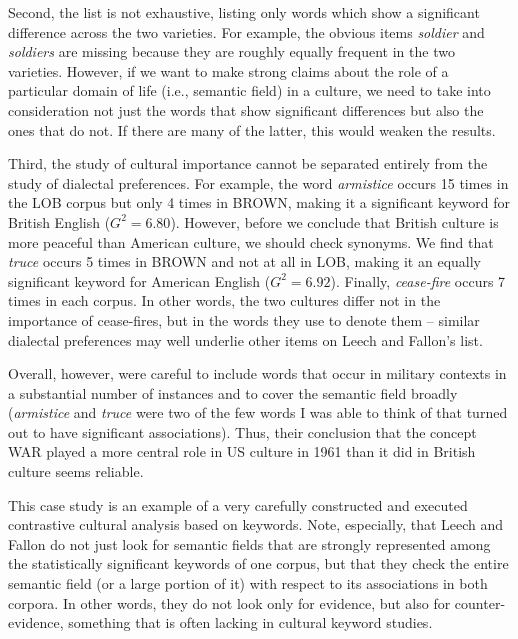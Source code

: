 Second, the list is not exhaustive, listing only words which show a significant difference across the two varieties.  For example, the obvious items \textit{soldier} and \textit{soldiers} are missing because they are roughly equally frequent in the two varieties. However, if we want to make strong claims about the role of a particular domain of life (i.e., semantic  field) in a culture,  we need to take into consideration not just the words that show significant differences but also the ones that do not. If there are many of the latter, this would weaken the results.

Third, the study of cultural  importance cannot be separated entirely from the study of dialectal preferences. For example, the word \textit{armistice} occurs 15 times in the LOB  corpus but only 4 times in BROWN,  making it a significant keyword  for British  English ($G^2=6.80$). However, before we conclude that British culture is more peaceful than American  culture,  we should check synonyms.  We find that \textit{truce} occurs 5 times in BROWN  and not at all in LOB,  making it an equally significant keyword for American English ($G^2=6.92$). Finally, \textit{cease\hyp{}fire} occurs 7 times in each corpus. In other words, the two cultures  differ not in the importance of cease\hyp{}fires, but in the words they use to denote them -- similar dialectal preferences may well underlie other items on Leech and Fallon's list.

Overall, however, \citet{leech_computer_1992} were careful to include words that occur in military contexts in a substantial number of instances and to cover the semantic  field broadly (\textit{armistice} and \textit{truce} were two of the few words I was able to think of that turned out to have significant associations).  Thus, their conclusion that the concept WAR played a more central role in US culture  in 1961 than it did in British culture seems reliable.

This case study is an example of a very carefully constructed and executed contrastive cultural  analysis based on keywords.  Note, especially, that Leech and Fallon do not just look for semantic  fields that are strongly represented among the statistically significant keywords of one corpus, but that they check the entire semantic field (or a large portion of it) with respect to its associations  in both corpora. In other words, they do not look only for evidence, but also for counter\hyp{}evidence, something that is often lacking in cultural  keyword  studies.

